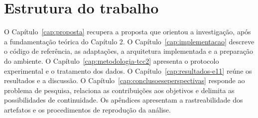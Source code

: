 \section{Estrutura do trabalho}

O Capítulo~\ref{cap:proposta} recupera a proposta que orientou a investigação, após a fundamentação teórica do Capítulo 2. O Capítulo~\ref{cap:implementacao} descreve o código de referência, as adaptações, a arquitetura implementada e a preparação do ambiente. O Capítulo~\ref{cap:metodologia-tcc2} apresenta o protocolo experimental e o tratamento dos dados. O Capítulo~\ref{cap:resultados-e11} reúne os resultados e a discussão. O Capítulo~\ref{cap:conclusoeseperspectivas} responde ao problema de pesquisa, relaciona as contribuições aos objetivos e delimita as possibilidades de continuidade. Os apêndices apresentam a rastreabilidade dos artefatos e os procedimentos de reprodução da análise.
